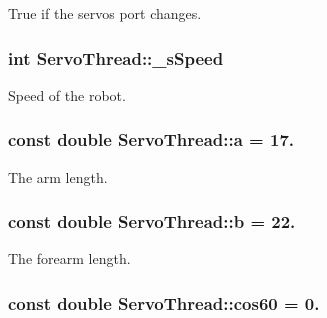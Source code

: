 True if the servos port changes. 

\hypertarget{a00008_acbcc5de85714af781eef3abb08087cf7}{}
\subsubsection[{\+\_\+s\+Speed}]{\setlength{\rightskip}{0pt plus 5cm}int Servo\+Thread\+::\+\_\+s\+Speed\hspace{0.3cm}{\ttfamily [private]}}\label{a00008_acbcc5de85714af781eef3abb08087cf7}


Speed of the robot. 

\hypertarget{a00008_a7dc3998d380d61406fe4485f9872edff}{}
\subsubsection[{a}]{\setlength{\rightskip}{0pt plus 5cm}const double Servo\+Thread\+::a = 17.\hspace{0.3cm}{\ttfamily [private]}}\label{a00008_a7dc3998d380d61406fe4485f9872edff}


The arm length. 

\hypertarget{a00008_a14f03febaa39a60b9bf7ff9b9151060c}{}
\subsubsection[{b}]{\setlength{\rightskip}{0pt plus 5cm}const double Servo\+Thread\+::b = 22.\hspace{0.3cm}{\ttfamily [private]}}\label{a00008_a14f03febaa39a60b9bf7ff9b9151060c}


The forearm length. 

\hypertarget{a00008_a86dc58ff23326f939cd6fb610ac90d53}{}
\subsubsection[{cos60}]{\setlength{\rightskip}{0pt plus 5cm}const double Servo\+Thread\+::cos60 = 0.\hspace{0.3cm}{\ttfamily [private]}}\label{a00008_a86dc58ff23326f939cd6fb610ac90d53}


